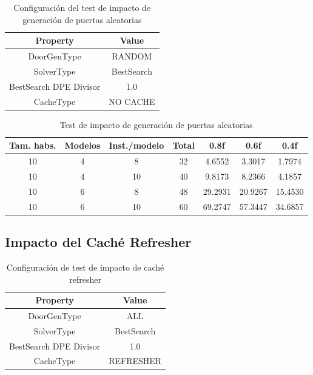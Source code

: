 \begin{table}[H]
\begin{center}
	\begin{tabular}{ | c | c | }
\hline
 		Property & Value \\ \hline
DoorGenType & RANDOM \\ 
SolverType & BestSearch \\ 
BestSearch DPE Divisor & 1.0 \\ 
CacheType & NO CACHE \\ 
\hline
	\end{tabular}
\end{center}
\caption{Configuración del test de impacto de generación de puertas aleatorias}
\label{table:cfg-randoors}
\end{table}


\begin{table}[H]
\begin{center}
	\begin{tabular}{ | c | c | c | c | c | c | c | }
\hline
Tam. habs. & Modelos & Inst./modelo & Total & 0.8f & 0.6f & 0.4f \\ \hline 
10 & 4 & 8 & 32 & 4.6552 & 3.3017 & 1.7974 \\ 
10 & 4 & 10 & 40 & 9.8173 & 8.2366 & 4.1857 \\ 
10 & 6 & 8 & 48 & 29.2931 & 20.9267 & 15.4530 \\ 
10 & 6 & 10 & 60 & 69.2747 & 57.3447 & 34.6857 \\ 
\hline
	\end{tabular}
\end{center}
\caption{Test de impacto de generación de puertas aleatorias}
\label{table:randoors}
\end{table}


\subsection{Impacto del Caché Refresher}

\begin{table}[H]
\begin{center}
	\begin{tabular}{ | c | c | }
\hline
 		Property & Value \\ \hline
DoorGenType & ALL \\ 
SolverType & BestSearch \\ 
BestSearch DPE Divisor & 1.0 \\ 
CacheType & REFRESHER \\ 
\hline
	\end{tabular}
\end{center}
\caption{Configuración de test de impacto de caché refresher}
\label{table:cfg-refresher}
\end{table}



